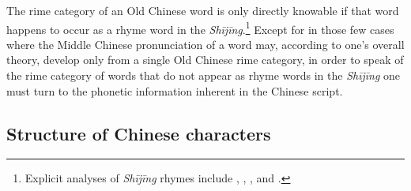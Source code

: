 The rime category of an Old Chinese word is only directly knowable if
that word happens to occur as a rhyme word in the
 \emph{Shījīng}.\footnote{Explicit analyses of  \emph{Shījīng} rhymes
  include 
  \citet{Karlgren1950},
  \citet{Wang1980a}, 
  \citet[583-743]{Baxter1992}, and \citet[]{Wang2011Shijing}.} Except for in those few cases where the Middle
Chinese pronunciation of a word may, according to one's overall theory,
develop only from a single Old Chinese rime category, in order to speak
of the rime category of words that do not appear as rhyme words in the
 \emph{Shījīng} one must turn to the phonetic information inherent in the
Chinese script.

\subsection{Structure of Chinese
characters}


